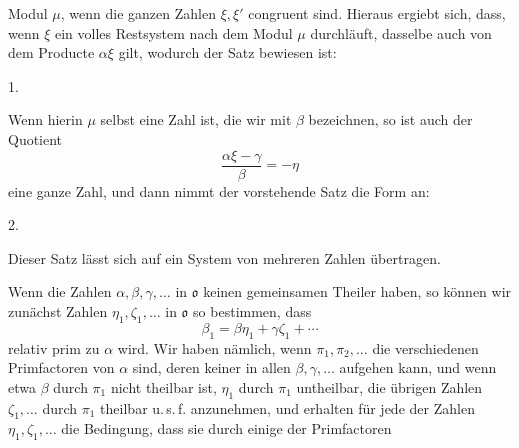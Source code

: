 Modul $\mu$, wenn die ganzen Zahlen $\xi, \xi'$ congruent sind. Hieraus
ergiebt sich, dass, wenn $\xi$ ein volles Restsystem nach dem Modul
$\mu$ durchläuft, dasselbe auch von dem Producte $\alpha\xi$ gilt,
wodurch der Satz bewiesen ist:

1. 

Wenn hierin $\mu$ selbst eine Zahl ist, die wir mit $\beta$ bezeichnen,
so ist auch der Quotient
\[
\frac{\alpha\xi - \gamma}{\beta} = -\eta
\]
eine ganze Zahl, und dann nimmt der vorstehende Satz die Form an:

2. 

Dieser Satz lässt sich auf ein System von mehreren Zahlen übertragen.

Wenn die Zahlen $\alpha, \beta, \gamma, \ldots$ in $\mathfrak{o}$ keinen
gemeinsamen Theiler haben, so können wir zunächst Zahlen $\eta_1, \zeta_1,
\ldots$ in $\mathfrak{o}$ so bestimmen, dass
\[
\beta_1 = \beta\eta_1 + \gamma\zeta_1 + \cdots
\]
relativ prim zu $\alpha$ wird. Wir haben nämlich, wenn $\pi_1, \pi_2,
\ldots$ die verschiedenen Primfactoren von $\alpha$ sind, deren keiner
in allen $\beta, \gamma, \ldots$ aufgehen kann, und wenn etwa $\beta$
durch $\pi_1$ nicht theilbar ist, $\eta_1$ durch $\pi_1$ untheilbar, die
übrigen Zahlen $\zeta_1, \ldots$ durch $\pi_1$ theilbar u.\,s.\,f.
anzunehmen, und erhalten für jede der Zahlen $\eta_1, \zeta_1, \ldots$ die
Bedingung, dass sie durch einige der Primfactoren
